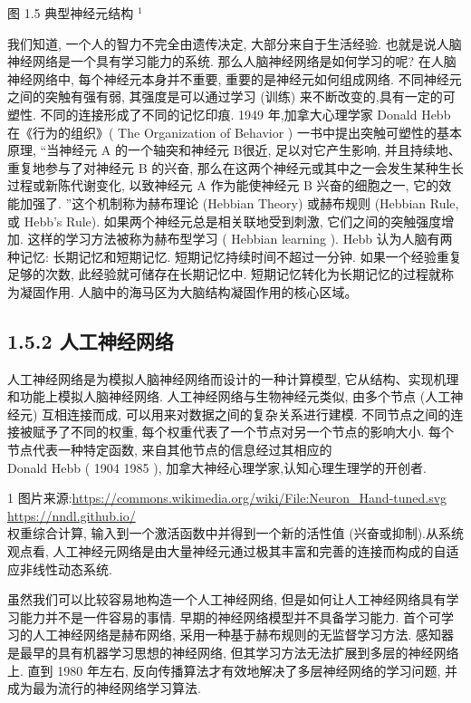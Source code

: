 \documentclass[10pt]{article}
\begin{document}
图 1.5 典型神经元结构 ${ }^{1}$

我们知道, 一个人的智力不完全由遗传决定, 大部分来自于生活经验. 也就是说人脑神经网络是一个具有学习能力的系统. 那么人脑神经网络是如何学习的呢? 在人脑神经网络中, 每个神经元本身并不重要, 重要的是神经元如何组成网络. 不同神经元之间的突触有强有弱, 其强度是可以通过学习 (训练) 来不断改变的,具有一定的可塑性. 不同的连接形成了不同的记忆印痕. 1949 年,加拿大心理学家 Donald Hebb 在《行为的组织》( The Organization of Behavior ) 一书中提出突触可塑性的基本原理, “当神经元 A 的一个轴突和神经元 B很近, 足以对它产生影响, 并且持续地、重复地参与了对神经元 B 的兴奋, 那么在这两个神经元或其中之一会发生某种生长过程或新陈代谢变化, 以致神经元 A 作为能使神经元 B 兴奋的细胞之一, 它的效能加强了. ”这个机制称为赫布理论 (Hebbian Theory) 或赫布规则 (Hebbian Rule, 或 Hebb's Rule). 如果两个神经元总是相关联地受到刺激, 它们之间的突触强度增加. 这样的学习方法被称为赫布型学习 ( Hebbian learning ). Hebb 认为人脑有两种记忆: 长期记忆和短期记忆. 短期记忆持续时间不超过一分钟. 如果一个经验重复足够的次数, 此经验就可储存在长期记忆中. 短期记忆转化为长期记忆的过程就称为凝固作用. 人脑中的海马区为大脑结构凝固作用的核心区域。

\subsection*{1.5.2 人工神经网络}
人工神经网络是为模拟人脑神经网络而设计的一种计算模型, 它从结构、实现机理和功能上模拟人脑神经网络. 人工神经网络与生物神经元类似, 由多个节点 (人工神经元) 互相连接而成, 可以用来对数据之间的复杂关系进行建模. 不同节点之间的连接被赋予了不同的权重, 每个权重代表了一个节点对另一个节点的影响大小. 每个节点代表一种特定函数, 来自其他节点的信息经过其相应的\\
Donald Hebb ( 1904 1985 ), 加拿大神经心理学家,认知心理生理学的开创者.

1 图片来源:\href{https://commons.wikimedia.org/wiki/File:Neuron_Hand-tuned.svg}{https://commons.wikimedia.org/wiki/File:Neuron\_Hand-tuned.svg} \href{https://nndl.github.io/}{https://nndl.github.io/}\\
权重综合计算, 输入到一个激活函数中并得到一个新的活性值 (兴奋或抑制).从系统观点看, 人工神经元网络是由大量神经元通过极其丰富和完善的连接而构成的自适应非线性动态系统.

虽然我们可以比较容易地构造一个人工神经网络, 但是如何让人工神经网络具有学习能力并不是一件容易的事情. 早期的神经网络模型并不具备学习能力. 首个可学习的人工神经网络是赫布网络, 采用一种基于赫布规则的无监督学习方法. 感知器是最早的具有机器学习思想的神经网络, 但其学习方法无法扩展到多层的神经网络上. 直到 1980 年左右, 反向传播算法才有效地解决了多层神经网络的学习问题, 并成为最为流行的神经网络学习算法.
\end{document}
